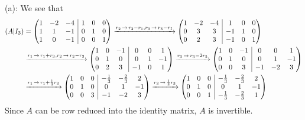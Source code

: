 \documentclass{eh-homework}
\begin{document}
\begin{question}{2}
        (a):
        We see that 
        \begin{align*}
            (A|I_3) &= \left( \begin{array}{@{}ccc|ccc@{}}
                1 & -2 & -4 & 1 & 0 & 0 \\
                1 & 1 & -1 & 0 & 1 & 0 \\
                1 & 0 & -1 & 0 & 0 & 1 \\
            \end{array} \right)
            \xrightarrow{r_2\,\to\,r_2 - r_1,r_3\,\to\,r_3 - r_1}
            \left( \begin{array}{@{}ccc|ccc@{}}
                1 & -2 & -4 & 1 & 0 & 0 \\
                0 & 3 & 3 & -1 & 1 & 0 \\
                0 & 2 & 3 & -1 & 0 & 1 \\
            \end{array} \right) \\
            &\xrightarrow{r_1\,\to\,r_1 + r_3,r_2\,\to\,r_2 - r_3}
            \left( \begin{array}{@{}ccc|ccc@{}}
                1 & 0 & -1 & 0 & 0 & 1 \\
                0 & 1 & 0 & 0 & 1 & -1 \\
                0 & 2 & 3 & -1 & 0 & 1 \\
            \end{array} \right)
            \xrightarrow{r_3\,\to\,r_3 - 2r_2}
            \left( \begin{array}{@{}ccc|ccc@{}}
                1 & 0 & -1 & 0 & 0 & 1 \\
                0 & 1 & 0 & 0 & 1 & -1 \\
                0 & 0 & 3 & -1 & -2 & 3 \\
            \end{array} \right) \\
            &\xrightarrow{r_1\,\to\,r_1 + \frac{1}{3}r_3}
            \left( \begin{array}{@{}ccc|ccc@{}}
                1 & 0 & 0 & -\frac{1}{3} & -\frac{2}{3} & 2 \\
                0 & 1 & 0 & 0 & 1 & -1 \\
                0 & 0 & 3 & -1 & -2 & 3 \\
            \end{array} \right)
            \xrightarrow{r_3\,\to\,\frac{1}{3}r_3}
            \left( \begin{array}{@{}ccc|ccc@{}}
                1 & 0 & 0 & -\frac{1}{3} & -\frac{2}{3} & 2 \\
                0 & 1 & 0 & 0 & 1 & -1 \\
                0 & 0 & 1 & -\frac{1}{3} & -\frac{2}{3} & 1 \\
            \end{array} \right)
        \end{align*}
        Since \(A\) can be row reduced into the identity matrix, \(A\) is invertible.


\end{question}
\end{document}
